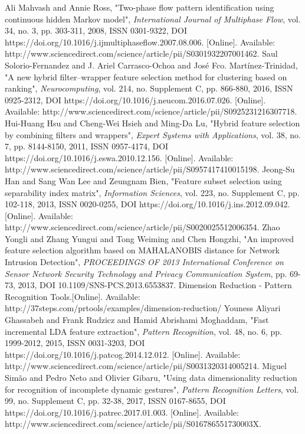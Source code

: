 \begin{thebibliography}{5}
 Ali Mahvash and Annie Ross, "Two-phase flow pattern identification using continuous hidden Markov model", \emph{International Journal of Multiphase Flow}, vol. 34, no. 3, pp. 303-311, 2008, ISSN 0301-9322, DOI https://doi.org/10.1016/j.ijmultiphaseflow.2007.08.006. [Online]. Available: http://www.sciencedirect.com/science/article/pii/S0301932207001462. 
 Saul Solorio-Fernandez and J. Ariel Carrasco-Ochoa and José Fco. Martínez-Trinidad, "A new hybrid filter–wrapper feature selection method for clustering based on ranking", \emph{Neurocomputing}, vol. 214, no. Supplement C, pp. 866-880, 2016, ISSN 0925-2312, DOI https://doi.org/10.1016/j.neucom.2016.07.026. [Online]. Available: http://www.sciencedirect.com/science/article/pii/S0925231216307718. 
 Hui-Huang Hsu and Cheng-Wei Hsieh and Ming-Da Lu, "Hybrid feature selection by combining filters and wrappers", \emph{Expert Systems with Applications}, vol. 38, no. 7, pp. 8144-8150, 2011, ISSN 0957-4174, DOI https://doi.org/10.1016/j.eswa.2010.12.156. [Online]. Available: http://www.sciencedirect.com/science/article/pii/S0957417410015198. 
 Jeong-Su Han and Sang Wan Lee and Zeungnam Bien, "Feature subset selection using separability index matrix", \emph{Information Sciences}, vol. 223, no. Supplement C, pp. 102-118, 2013, ISSN 0020-0255, DOI https://doi.org/10.1016/j.ins.2012.09.042. [Online]. Available: http://www.sciencedirect.com/science/article/pii/S0020025512006354. 
 Zhao Yongli and Zhang Yungui and Tong Weiming and Chen Hongzhi, "An improved feature selection algorithm based on MAHALANOBIS distance for Network Intrusion Detection", \emph{PROCEEDINGS OF 2013 International Conference on Sensor Network Security Technology and Privacy Communication System}, pp. 69-73, 2013, DOI 10.1109/SNS-PCS.2013.6553837.
 Dimension Reduction - Pattern Recognition Tools.[Online]. Available: http://37steps.com/prtools/examples/dimension-reduction/
 Youness Aliyari Ghassabeh and Frank Rudzicz and Hamid Abrishami Moghaddam, "Fast incremental LDA feature extraction", \emph{Pattern Recognition}, vol. 48, no. 6, pp. 1999-2012, 2015, ISSN 0031-3203, DOI https://doi.org/10.1016/j.patcog.2014.12.012. [Online]. Available: http://www.sciencedirect.com/science/article/pii/S0031320314005214.
 Miguel Simão and Pedro Neto and Olivier Gibaru, "Using data dimensionality reduction for recognition of incomplete dynamic gestures", \emph{Pattern Recognition Letters}, vol. 99, no. Supplement C, pp. 32-38, 2017, ISSN 0167-8655, DOI https://doi.org/10.1016/j.patrec.2017.01.003. [Online]. Available: http://www.sciencedirect.com/science/article/pii/S016786551730003X.

\end{thebibliography}

